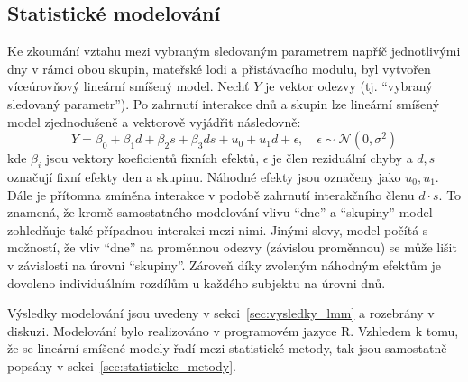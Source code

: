 \subsection{Statistické modelování}
\label{subsec:tvorba_modelů}
Ke zkoumání vztahu mezi vybraným sledovaným parametrem napříč jednotlivými dny v
rámci obou skupin, mateřské lodi a přistávacího modulu, byl vytvořen
víceúrovňový lineární smíšený model. Nechť $Y$ je vektor odezvy (tj.
\enquote{vybraný sledovaný parametr}). Po zahrnutí interakce dnů a skupin lze
lineární smíšený model zjednodušeně a vektorově vyjádřit následovně:
\begin{equation}
      Y = \beta_{0}+\beta_{1} {d}+\beta_{2} {s}+\beta_{3} {d} {s} + u_{0} + u_{1}d + \epsilon, \quad \epsilon \sim \mathcal{N}\left(0, \sigma^2\right)
\end{equation}
kde $\beta_i$ jsou vektory koeficientů fixních efektů, $\epsilon$ je člen
reziduální chyby a $d, s$ označují fixní efekty den a skupinu. Náhodné efekty
jsou označeny jako $u_0, u_1$. Dále je přítomna zmíněna interakce v podobě
zahrnutí interakčního členu $d \cdot s$. To znamená, že kromě samostatného
modelování vlivu \enquote{dne} a \enquote{skupiny} model zohledňuje také
případnou interakci mezi nimi. Jinými slovy, model počítá s možností, že vliv
\enquote{dne} na proměnnou odezvy (závislou proměnnou) se může lišit v
závislosti na úrovni \enquote{skupiny}. Zároveň díky zvoleným náhodným efektům
je dovoleno individuálním rozdílům u každého subjektu na úrovni dnů.

Výsledky modelování jsou uvedeny v sekci~\ref{sec:vysledky_lmm} a rozebrány v
diskuzi. Modelování bylo realizováno v programovém jazyce R. Vzhledem k tomu, že
se lineární smíšené modely řadí mezi statistické metody, tak jsou samostatně
popsány v sekci~\ref{sec:statisticke_metody}.